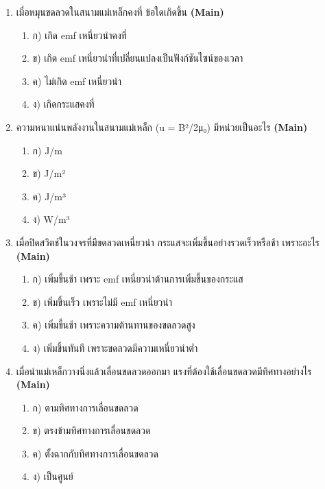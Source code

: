 \documentclass[12pt]{article}
\begin{document}
\begin{enumerate}[label=\arabic*.]
\begin{enumerate}[label=)]
\item ก) เพิ่มเป็น 2 เท่า
\item ข) เพิ่มเป็น 4 เท่า
\item ค) ลดลงเป็น 1/2 เท่า
\item ง) เพิ่มเป็น √2 เท่า
\end{enumerate}
\item เมื่อหมุนขดลวดในสนามแม่เหล็กคงที่ ข้อใดเกิดขึ้น \hfill \textbf{\small (Main)}
\begin{enumerate}[label=)]
\item ก) เกิด emf เหนี่ยวนำคงที่
\item ข) เกิด emf เหนี่ยวนำที่เปลี่ยนแปลงเป็นฟังก์ชันไซน์ของเวลา
\item ค) ไม่เกิด emf เหนี่ยวนำ
\item ง) เกิดกระแสคงที่
\end{enumerate}
\item ความหนาแน่นพลังงานในสนามแม่เหล็ก (u = B²/2μ₀) มีหน่วยเป็นอะไร \hfill \textbf{\small (Main)}
\begin{enumerate}[label=)]
\item ก) J/m
\item ข) J/m²
\item ค) J/m³
\item ง) W/m³
\end{enumerate}
\item เมื่อปิดสวิตช์ในวงจรที่มีขดลวดเหนี่ยวนำ กระแสจะเพิ่มขึ้นอย่างรวดเร็วหรือช้า เพราะอะไร \hfill \textbf{\small (Main)}
\begin{enumerate}[label=)]
\item ก) เพิ่มขึ้นช้า เพราะ emf เหนี่ยวนำต้านการเพิ่มขึ้นของกระแส
\item ข) เพิ่มขึ้นเร็ว เพราะไม่มี emf เหนี่ยวนำ
\item ค) เพิ่มขึ้นช้า เพราะความต้านทานของขดลวดสูง
\item ง) เพิ่มขึ้นทันที เพราะขดลวดมีความเหนี่ยวนำต่ำ
\end{enumerate}
\item เมื่อนำแม่เหล็กวางนิ่งแล้วเลื่อนขดลวดออกมา แรงที่ต้องใช้เลื่อนขดลวดมีทิศทางอย่างไร \hfill \textbf{\small (Main)}
\begin{enumerate}[label=)]
\item ก) ตามทิศทางการเลื่อนขดลวด
\item ข) ตรงข้ามทิศทางการเลื่อนขดลวด
\item ค) ตั้งฉากกับทิศทางการเลื่อนขดลวด
\item ง) เป็นศูนย์

\end{enumerate}
\end{enumerate}
\end{document}
